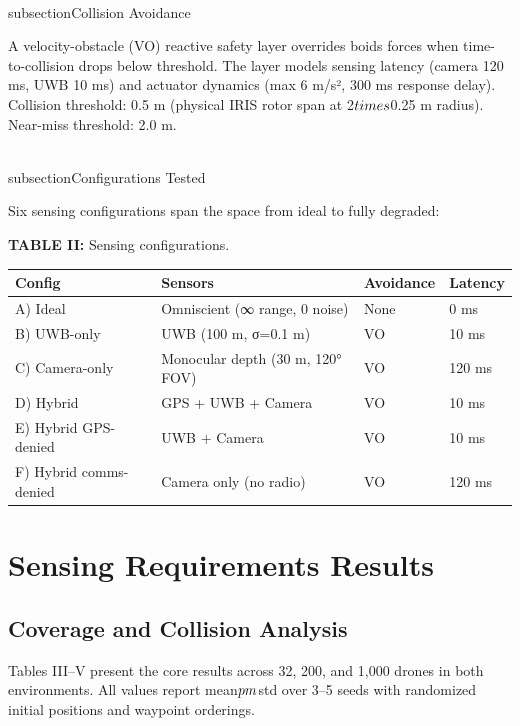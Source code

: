 \documentclass[conference]{IEEEtran}
\begin{document}
\\subsection{Collision Avoidance}\label{d.-collision-avoidance}

A velocity-obstacle (VO) reactive safety layer overrides boids forces
when time-to-collision drops below threshold. The layer models sensing
latency (camera 120 ms, UWB 10 ms) and actuator dynamics (max 6 m/s²,
300 ms response delay). Collision threshold: 0.5 m (physical IRIS rotor
span at 2$\\times$0.25 m radius). Near-miss threshold: 2.0 m.

\\subsection{Configurations Tested}\label{e.-configurations-tested}

Six sensing configurations span the space from ideal to fully degraded:

\textbf{TABLE II:} Sensing configurations.

{\def\LTcaptype{none} %
\begin{longtable}[]{@{}llll@{}}
\toprule\noalign{}
Config & Sensors & Avoidance & Latency \\
\midrule\noalign{}
\endhead
\bottomrule\noalign{}
\endlastfoot
A) Ideal & Omniscient (∞ range, 0 noise) & None & 0 ms \\
B) UWB-only & UWB (100 m, σ=0.1 m) & VO & 10 ms \\
C) Camera-only & Monocular depth (30 m, 120° FOV) & VO & 120 ms \\
D) Hybrid & GPS + UWB + Camera & VO & 10 ms \\
E) Hybrid GPS-denied & UWB + Camera & VO & 10 ms \\
F) Hybrid comms-denied & Camera only (no radio) & VO & 120 ms \\
\end{longtable}
}

\section{Sensing Requirements Results}\label{iv.-sensing-requirements-results}

\subsection{Coverage and Collision Analysis}\label{a.-coverage-and-collision-analysis}

Tables III--V present the core results across 32, 200, and 1,000 drones
in both environments. All values report mean$\\pm$std over 3--5 seeds with
randomized initial positions and waypoint orderings.
\end{document}
